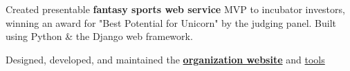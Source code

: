 \documentclass[]{two-column-resume}
\begin{document}
\begin{minipage}[t]{0.65\textwidth}

\vspace{0.9em} %

\begin{tightemize}
\item Created presentable {\bf fantasy sports web service} MVP to
incubator investors, winning an award for "Best Potential for Unicorn"
by the judging panel. Built using Python \& the Django web framework.
\end{tightemize}
\sectionsep


\vspace{\topsep} %

\begin{tightemize}
\item Designed, developed, and maintained the 
{\bf \href{https://www.skullhouse.nyc}{organization website}} and 
\href{https://github.com/JasonYao/Bobst-Room-Automator}{tools}
\end{tightemize}
\sectionsep




\end{minipage}
\end{document}
